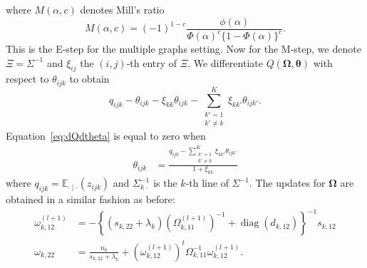 \documentclass[a4paper, 11pt, oneside]{report}
\DeclareMathOperator{\diag}{diag}
\newcommand{\E}{\mathbb{E}}
\newcommand{\1}{\mathds{1}}
\newcommand{\inv}{^{-1}}
\newcommand{\bOmega}{\mathbf{\Omega}}
\newcommand{\btheta}{\mathbf{\theta}}
\begin{document}
where $M(\alpha, c)$ denotes Mill's ratio
\[
	M(\alpha, c) = (-1)^{1-c}\frac{\phi(\alpha)}{\Phi(\alpha)^c \{1 - \Phi(\alpha)\}^c}.
\]
This is the E-step for the multiple graphs setting.
Now for the M-step, we denote $\Xi = \Sigma\inv$ and $\xi_{ij}$ the $(i, j)$-th entry of $\Xi$.
We differentiate $Q(\bOmega, \btheta)$ with respect to
$\theta_{ijk}$ to obtain
\begin{equation}\label{eq:dQdtheta}
	q_{ijk} - \theta_{ijk}  - \xi_{kk} \theta_{ijk} - \sum_{\substack
		{k' = 1 \\ k' \neq k}}^K \xi_{k k'} \theta_{ijk'}.
\end{equation}
Equation~\eqref{eq:dQdtheta} is equal to
zero when
\begin{align*}
	\theta_{ijk} & = \frac{q_{ijk} - \sum_{\substack{k'=1 \\ k' \neq k}}^K \xi_{k k'}\theta_{ijk'}}{ 1 + \xi_{kk}}
\end{align*}
where $q_{ijk} = \E_{\cdot \mid \cdot}(z_{ijk})$ and $\Sigma_{k \, \cdot}\inv$ is
the $k$-th line of $\Sigma\inv$.
The updates for $\bOmega$ are obtained in a similar fashion as before:
\begin{align*}
	\omega_{k,12}^{(l+1)} & = -\left\{(s_{k, 22} + \lambda_k) \left(\Omega_{k, 11}^{(l+1)}\right)\inv + \diag(d_{k, 12})\right\}\inv s_{k, 12}  \\
	\omega_{k, 22}        & = \frac{n_k}{s_{k,22} + \lambda_k} + \left(\omega_{k,12}^{(l+1)}\right)^t \Omega_{k, 11}\inv \omega_{k, 12}^{(l+1)}.
\end{align*}
\end{document}
